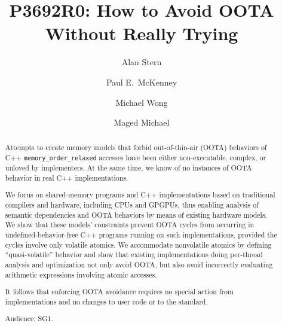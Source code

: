 

\usepackage[T1]{fontenc} %
\usepackage{textcomp} %

\usepackage{microtype}

\usepackage{lscape}
\usepackage{fancyhdr}
\usepackage{subfigure}
\usepackage{url}
\usepackage{graphics}
\usepackage{ifthen}
\usepackage{float}
\usepackage{listings}
\lstset{basicstyle=\ttfamily}



\DeclareUrlCommand\email{}

\pagestyle{plain}



\title{P3692R0: How to Avoid OOTA Without Really Trying}

\newcommand{\co}[1]{\lstinline[breaklines=yes,breakatwhitespace=yes]{#1}}

\author{
Alan Stern \and
Paul E.~McKenney \and
Michael Wong \and
Maged Michael
}

\begin{abstract}
	Attempts to create memory models that forbid out-of-thin-air
	(OOTA) behaviors of C++ \co{memory_order_relaxed} accesses
	have been either non-executable, complex, or unloved by
	implementers.
	At the same time, we know of no instances of OOTA behavior in real C++
	implementations.

	We focus on shared-memory programs and C++ implementations based
	on traditional compilers and hardware, including CPUs and GPGPUs,
	thus enabling analysis of semantic dependencies and OOTA behaviors
	by means of existing hardware models.
	We show that these models' constraints prevent OOTA cycles from
	occurring in undefined-behavior-free C++ programs running on
	such implementations, provided the cycles involve only volatile
	atomics.
	We accommodate nonvolatile atomics by defining ``quasi-volatile''
	behavior and show that existing implementations doing per-thread
	analysis and optimization not only avoid OOTA, but also avoid
	incorrectly evaluating arithmetic expressions involving atomic
	accesses.

	It follows that enforcing OOTA avoidance requires no special
	action from implementations and no changes to user code or
	to the standard.

	Audience: SG1.
\end{abstract}
\maketitle{}

